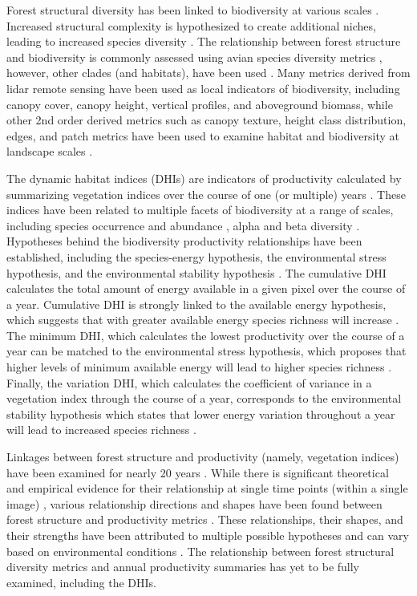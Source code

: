 \documentclass[
  authoryear,
  review,
  3p,
  twocolumn]{elsarticle}
\begin{document}
Forest structural diversity has been linked to biodiversity at various
scales \citep{guo2017, bergen2009, gao2014}. Increased structural
complexity is hypothesized to create additional niches, leading to
increased species diversity \citep{bergen2009}. The relationship between
forest structure and biodiversity is commonly assessed using avian
species diversity metrics \citep{macarthur1961, goetz2007}, however,
other clades (and habitats), have been used
\citep{davies2014, nelson2005}. Many metrics derived from lidar remote
sensing have been used as local indicators of biodiversity, including
canopy cover, canopy height, vertical profiles, and aboveground biomass,
while other 2nd order derived metrics such as canopy texture, height
class distribution, edges, and patch metrics have been used to examine
habitat and biodiversity at landscape scales \citep{bergen2009}.

The dynamic habitat indices (DHIs) are indicators of productivity
calculated by summarizing vegetation indices over the course of one (or
multiple) years \citep{radeloff2019}. These indices have been related to
multiple facets of biodiversity at a range of scales, including species
occurrence and abundance \citep{razenkova2020}, alpha
\citep{radeloff2019} and beta diversity \citep{andrew2012}. Hypotheses
behind the biodiversity productivity relationships have been
established, including the species-energy hypothesis, the environmental
stress hypothesis, and the environmental stability hypothesis
\citep{coops2019}. The cumulative DHI calculates the total amount of
energy available in a given pixel over the course of a year. Cumulative
DHI is strongly linked to the available energy hypothesis, which
suggests that with greater available energy species richness will
increase \citep{wright1983}. The minimum DHI, which calculates the
lowest productivity over the course of a year can be matched to the
environmental stress hypothesis, which proposes that higher levels of
minimum available energy will lead to higher species richness
\citep{currie2004}. Finally, the variation DHI, which calculates the
coefficient of variance in a vegetation index through the course of a
year, corresponds to the environmental stability hypothesis which states
that lower energy variation throughout a year will lead to increased
species richness \citep{williams2008}.

Linkages between forest structure and productivity (namely, vegetation
indices) have been examined for nearly 20 years \citetext{\citealp[
\citet{knyazikhin1998}]{huete2002}; \citealp{myneni1994}}. While there
is significant theoretical and empirical evidence for their relationship
at single time points (within a single image) \citep{myneni1994},
various relationship directions and shapes have been found between
forest structure and productivity metrics \citep{ali2019}. These
relationships, their shapes, and their strengths have been attributed to
multiple possible hypotheses and can vary based on environmental
conditions \citep{ali2019}. The relationship between forest structural
diversity metrics and annual productivity summaries has yet to be fully
examined, including the DHIs.
\end{document}
